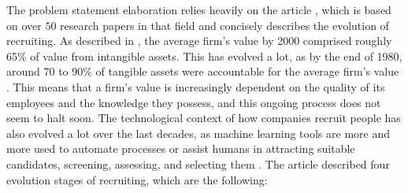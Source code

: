 \documentclass[draft,final]{thesisclass} %
\begin{document}
The problem statement elaboration relies heavily on the article \textcite{ai_recruiting}, which is based on over $50$ research papers in that field and concisely describes the evolution of recruiting.
As described in \textcite[1]{ai_recruiting}, the average firm's value by 2000 comprised roughly 65\% of value from intangible assets.
This has evolved a lot, as by the end of 1980, around 70 to 90\% of tangible assets were accountable for the average firm's value \parencite[1]{ai_recruiting}.
This means that a firm's value is increasingly dependent on the quality of its employees and the knowledge they possess, and this ongoing process does not seem to halt soon.
The technological context of how companies recruit people has also evolved a lot over the last decades, as machine learning tools are more and more used to automate processes or assist humans in attracting suitable candidates, screening, assessing, and selecting them \parencite[2]{ai_recruiting}.
The article \textcite[2-4]{ai_recruiting} described four evolution stages of recruiting, which are the following:
\end{document}
